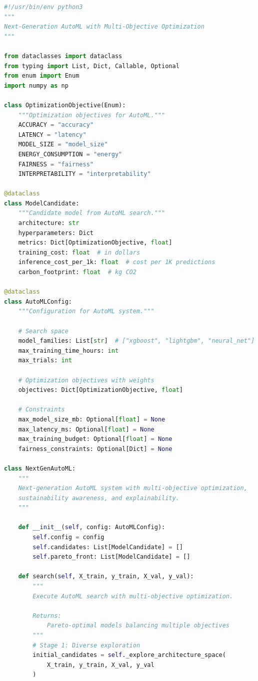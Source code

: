 \begin{lstlisting}[language=Python, caption=Next-Generation AutoML Framework]
#!/usr/bin/env python3
"""
Next-Generation AutoML with Multi-Objective Optimization
"""

from dataclasses import dataclass
from typing import List, Dict, Callable, Optional
from enum import Enum
import numpy as np

class OptimizationObjective(Enum):
    """Optimization objectives for AutoML."""
    ACCURACY = "accuracy"
    LATENCY = "latency"
    MODEL_SIZE = "model_size"
    ENERGY_CONSUMPTION = "energy"
    FAIRNESS = "fairness"
    INTERPRETABILITY = "interpretability"

@dataclass
class ModelCandidate:
    """Candidate model from AutoML search."""
    architecture: str
    hyperparameters: Dict
    metrics: Dict[OptimizationObjective, float]
    training_cost: float  # in dollars
    inference_cost_per_1k: float  # cost per 1K predictions
    carbon_footprint: float  # kg CO2

@dataclass
class AutoMLConfig:
    """Configuration for AutoML system."""

    # Search space
    model_families: List[str]  # ["xgboost", "lightgbm", "neural_net"]
    max_training_time_hours: int
    max_trials: int

    # Optimization objectives with weights
    objectives: Dict[OptimizationObjective, float]

    # Constraints
    max_model_size_mb: Optional[float] = None
    max_latency_ms: Optional[float] = None
    max_training_budget: Optional[float] = None
    fairness_constraints: Optional[Dict] = None

class NextGenAutoML:
    """
    Next-generation AutoML system with multi-objective optimization,
    sustainability awareness, and explainability.
    """

    def __init__(self, config: AutoMLConfig):
        self.config = config
        self.candidates: List[ModelCandidate] = []
        self.pareto_front: List[ModelCandidate] = []

    def search(self, X_train, y_train, X_val, y_val):
        """
        Execute AutoML search with multi-objective optimization.

        Returns:
            Pareto-optimal models balancing multiple objectives
        """
        # Stage 1: Diverse exploration
        initial_candidates = self._explore_architecture_space(
            X_train, y_train, X_val, y_val
        )


\end{lstlisting}
